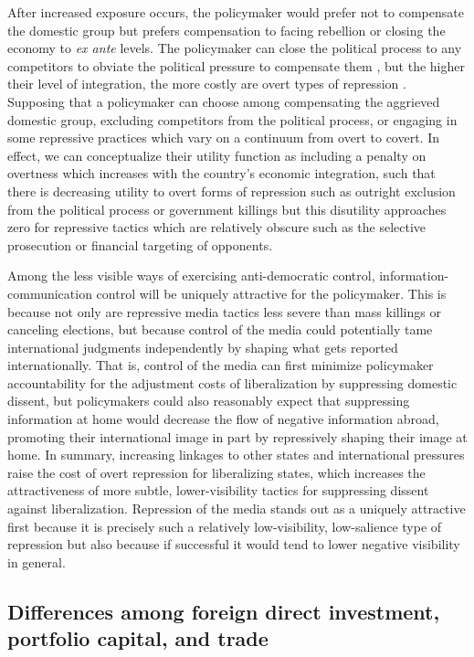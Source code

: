 \documentclass[12pt,a4paper]{article}\usepackage[]{graphicx}\usepackage[]{color}
\begin{document}
After increased exposure occurs, the policymaker would prefer not to compensate the domestic group but prefers compensation to facing rebellion or closing the economy to \emph{ex ante} levels. The policymaker can close the political process to any competitors to obviate the political pressure to compensate them \parencite{Adsera:2002vt}, but the higher their level of integration, the more costly are overt types of repression \parencite{Levitsky:2002gx}. Supposing that a policymaker can choose among compensating the aggrieved domestic group, excluding competitors from the political process, or engaging in some repressive practices which vary on a continuum from overt to covert. In effect, we can conceptualize their utility function as including a penalty on overtness which increases with the country's economic integration, such that there is decreasing utility to overt forms of repression such as outright exclusion from the political process or government killings but this disutility approaches zero for repressive tactics which are relatively obscure such as the selective prosecution or financial targeting of opponents.

Among the less visible ways of exercising anti-democratic control, information-communication control will be uniquely attractive for the policymaker. This is because not only are repressive media tactics less severe than mass killings or canceling elections, but because control of the media could potentially tame international judgments independently by shaping what gets reported internationally. That is, control of the media can first minimize policymaker accountability for the adjustment costs of liberalization by suppressing domestic dissent, but policymakers could also reasonably expect that suppressing information at home would decrease the flow of negative information abroad, promoting their international image in part by repressively shaping their image at home. In summary, increasing linkages to other states and international pressures raise the cost of overt repression for liberalizing states, which increases the attractiveness of more subtle, lower-visibility tactics for suppressing dissent against liberalization. Repression of the media stands out as a uniquely attractive first because it is precisely such a relatively low-visibility, low-salience type of repression but also because if successful it would tend to lower negative visibility in general.

\subsection{Differences among foreign direct investment, portfolio capital, and trade}
\end{document}
